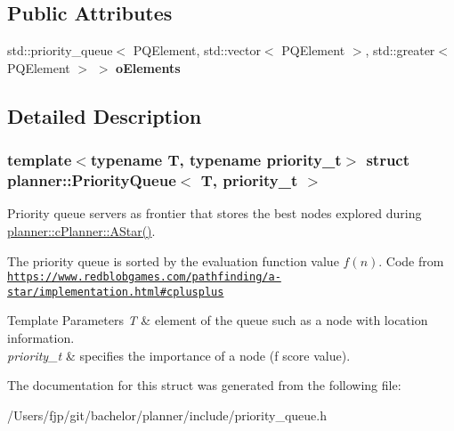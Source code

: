 \subsection*{Public Attributes}
\begin{DoxyCompactItemize}
\item 
\mbox{\label{structplanner_1_1_priority_queue_ac8dd7ed5a5d4b65eed6ccbe2b503dd3b}} 
std\+::priority\+\_\+queue$<$ P\+Q\+Element, std\+::vector$<$ P\+Q\+Element $>$, std\+::greater$<$ P\+Q\+Element $>$ $>$ {\bfseries o\+Elements}
\end{DoxyCompactItemize}


\subsection{Detailed Description}
\subsubsection*{template$<$typename T, typename priority\+\_\+t$>$\newline
struct planner\+::\+Priority\+Queue$<$ T, priority\+\_\+t $>$}

Priority queue servers as frontier that stores the best nodes explored during \mbox{\hyperlink{classplanner_1_1c_planner_a341e70531266f023ac9461d18979d1ef}{planner\+::c\+Planner\+::\+A\+Star()}}. 

The priority queue is sorted by the evaluation function value $f(n)$. Code from \href{https://www.redblobgames.com/pathfinding/a-star/implementation.html#cplusplus}{\tt https\+://www.\+redblobgames.\+com/pathfinding/a-\/star/implementation.\+html\#cplusplus}


\begin{DoxyTemplParams}{Template Parameters}
{\em T} & element of the queue such as a node with location information. \\
\hline
{\em priority\+\_\+t} & specifies the importance of a node (f score value). \\
\hline
\end{DoxyTemplParams}


The documentation for this struct was generated from the following file\+:\begin{DoxyCompactItemize}
\item 
/\+Users/fjp/git/bachelor/planner/include/priority\+\_\+queue.\+h\end{DoxyCompactItemize}

